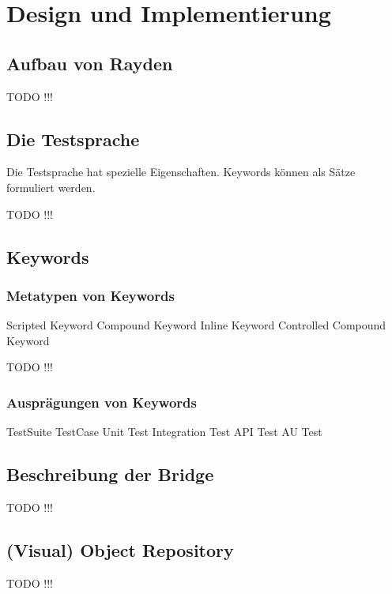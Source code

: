 ﻿\chapter{Design und Implementierung}
\label{cha:DesignUndImplementierung}

\section{Aufbau von Rayden}

TODO !!!

\section{Die Testsprache}

Die Testsprache hat spezielle Eigenschaften. Keywords können als Sätze formuliert werden.

TODO !!!

\section{Keywords}


\subsection{Metatypen von Keywords}

Scripted Keyword
Compound Keyword
Inline Keyword 
Controlled Compound Keyword

TODO !!!

\subsection{Ausprägungen von Keywords}

TestSuite
TestCase
Unit Test
Integration Test
API Test
AU Test




\section{Beschreibung der Bridge}

TODO !!!

\section{(Visual) Object Repository}

TODO !!!

